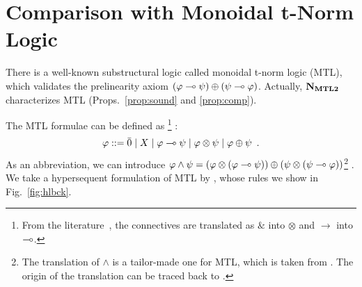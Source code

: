 \documentclass[envcountsame]{llncs}
\begin{document}
\section{Comparison with Monoidal t-Norm Logic}
\label{sec:as-logic}

There is a well-known substructural logic called monoidal t-norm logic
(MTL), which validates the prelinearity axiom
$(\varphi\multimap\psi)\oplus(\psi\multimap\varphi)$.  Actually, $\mathbf{N}_{\mathbf{MTL2}}$ characterizes
MTL (Props.~\ref{prop:sound} and \ref{prop:comp}).

The MTL formulae can be defined as%
\footnote{From the literature~\citep{handbook:fuzzy}, the connectives
are translated as $\&$ into $\otimes$ and $\rightarrow$ into $\multimap$.}%
:
\[
 \varphi::= \bar{0}\mid X\mid \varphi\multimap\psi \mid \varphi\otimes \psi \mid \varphi \oplus \psi\enspace.
\]
As an abbreviation, we can introduce $\varphi\land\psi =  (\varphi\otimes(\varphi\multimap\psi))\oplus
 (\psi\otimes(\psi\multimap\varphi))$\footnote{
The translation of $\wedge$ is a tailor-made one for MTL,
 which is taken from \citep[p.~48]{handbook:fuzzy}.
 The origin of the translation
can be traced back to \citet[Lem.~6.5]{Cintula200740}.}%
.
We take a hypersequent formulation of MTL by
\citet{baaz2004analytic}, whose rules we show in Fig.~\ref{fig:hlbck}.
\end{document}
